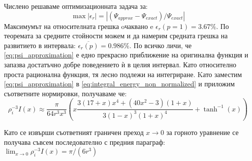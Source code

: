 Числено решаваме оптимизационната задача за: 
\begin{equation*}
	\max |\epsilon_r| = |(\Psi_{approx}-\Psi_{exact})/\Psi_{exact}|
\end{equation*}
Максимумът на относителната грешка oчаквано e $\epsilon_r(p = 1) = 3.67\%$. По теоремата за средните стойности можем и да намерим
средната грешка на развитието в интервала: $\overline{\epsilon_r(p)} = 0.986\%$. По всичко личи, че \autoref{eq:psi_approximation} е едно прекрасно приближение на оригинална функция и запазва достатъчно добре поведението ѝ в целия интервал.
Като относително проста рационална функция, тя лесно подлежи на интегриране. Kато заместим \autoref{eq:psi_approximation} в \autoref{eq:integral_energy_non_normalized} и приложим съответните нормировки, получаваме че:
\begin{equation}
	\label{eq:arctan_approx}
	\rho_{i}^{-3} I(x) \approx \frac{\pi }{64 r^3 x^3} \left( x \frac{3 (17+x) x^4+\left(40 x^2-3\right) (1+x)}{3 (1-x)^3 (1+x)^4} +\tanh ^{-1}(x) \right)
\end{equation}

Като се извърши съответният граничен преход $ x \rightarrow 0 $ за горното уравнение се получава съвсем последователно с предния параграф:  $\lim_{x\to 0} \rho_{i}^{-3} I(x) = \pi/(6 r^3)$